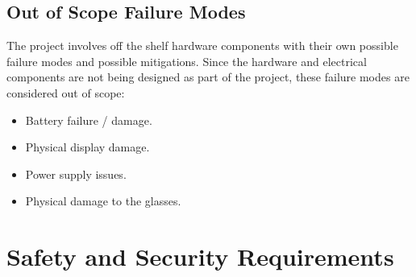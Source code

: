 \documentclass{article}
\begin{document}
\restoregeometry

\pdfpagewidth=8.5in
\pdfpageheight=11in

\subsection{Out of Scope Failure Modes}
The project involves off the shelf hardware components with their own possible
failure modes and possible mitigations. Since the hardware and electrical 
components are not being designed as part of the project, 
these failure modes are considered out of scope:
\begin{itemize}
    \item Battery failure / damage.
    \item Physical display damage.
    \item Power supply issues.
    \item Physical damage to the glasses.
\end{itemize}


\section{Safety and Security Requirements}
\end{document}
